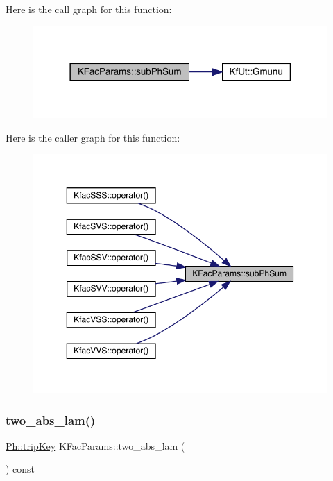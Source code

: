Here is the call graph for this function\+:\nopagebreak
\begin{figure}[H]
\begin{center}
\leavevmode
\includegraphics[width=318pt]{d7/d41/classKFacParams_ac52a334fdecfea49db82683e194580a1_cgraph}
\end{center}
\end{figure}
Here is the caller graph for this function\+:\nopagebreak
\begin{figure}[H]
\begin{center}
\leavevmode
\includegraphics[width=350pt]{d7/d41/classKFacParams_ac52a334fdecfea49db82683e194580a1_icgraph}
\end{center}
\end{figure}
\mbox{\label{classKFacParams_a023894ddf4ee41134ce512a2bd2a8075}} 
\subsubsection{\texorpdfstring{two\_abs\_lam()}{two\_abs\_lam()}}
{\footnotesize\ttfamily \mbox{\hyperlink{namespacePh_afdd5bf3d7b37625115089ea3048e0cbb}{Ph\+::trip\+Key}} K\+Fac\+Params\+::two\+\_\+abs\+\_\+lam (\begin{DoxyParamCaption}{ }\end{DoxyParamCaption}) const\hspace{0.3cm}{\ttfamily [virtual]}}



